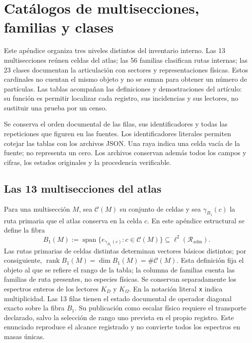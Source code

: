 \clearpage
\section{Catálogos de multisecciones, familias y clases}
\label{sec:vi-catalogos-estructurales}

Este apéndice organiza tres niveles distintos del inventario interno. Las
13 multisecciones reúnen celdas del atlas; las 56 familias clasifican rutas
internas; las 23 clases documentan la articulación con sectores y
representaciones físicas. Estos cardinales no cuentan el mismo objeto y
no se suman para obtener un número de partículas. Las tablas acompañan las
definiciones y demostraciones del artículo: su función es permitir localizar
cada registro, sus incidencias y sus lectores, no sustituir una prueba por un censo.

Se conserva el orden documental de las filas, sus identificadores y todas
las repeticiones que figuren en las fuentes. Los identificadores literales
permiten cotejar las tablas con los archivos JSON. Una raya indica una celda
vacía de la fuente; no representa un cero. Los archivos conservan además todos
los campos y cifras, los estados originales y la procedencia verificable.
\CatalogRouteReference

\subsection{Las 13 multisecciones del atlas}

Para una multisección \(M\), sea \(\mathcal C(M)\) su conjunto de celdas y
sea \(\gamma_{B_1}(c)\) la ruta primaria que el atlas conserva en la celda
\(c\). En este apéndice estructural se define la fibra
\[
 B_1(M):=
 \operatorname{span}\bigl\{e_{\gamma_{B_1}(c)}:c\in\mathcal C(M)\bigr\}
 \subseteq \ell^2(\mathcal R_{\mathrm{adm}}).
\]
Las rutas primarias de celdas distintas determinan vectores básicos distintos;
por consiguiente,
\(\operatorname{rank}B_1(M)=\dim B_1(M)=\#\mathcal C(M)\).
Esta definición fija el objeto al que se refiere el rango de la tabla; la
columna de familias cuenta las
familias de ruta presentes, no especies físicas. Se conservan separadamente
los espectros enteros de los lectores \(K_D\) y \(K_\Omega\).
En la notación literal \texttt{x} indica multiplicidad. Las 13 filas tienen
el estado documental de operador diagonal exacto sobre la fibra \(B_1\).
Su publicación como escalar físico requiere el transporte declarado, salvo
la selección de rango uno prevista en el propio registro. Este enunciado
reproduce el alcance registrado y no convierte todos los espectros en masas únicas.

